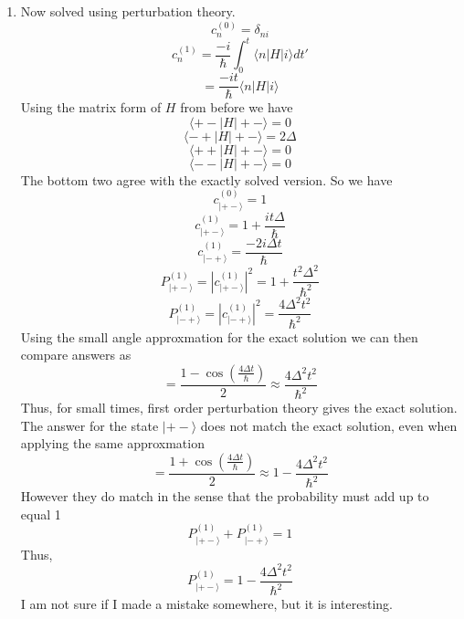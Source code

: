 \documentclass[12pt]{article}
\newcommand{\ket}[1]{\vert{#1}\rangle}
\begin{document}
\begin{enumerate}
    \item Now solved using perturbation theory. 
    $$ c_n^{(0)} = \delta_{ni} $$
    $$ c_n^{(1)} = \frac{-i}{\hbar} \int_0^t \langle n | H | i \rangle dt' $$
    $$ = \frac{-it}{\hbar} \langle n | H | i \rangle $$
    Using the matrix form of $H$ from before we have 
    $$ \langle +- | H | +- \rangle =0 $$
    $$ \langle -+ | H | +- \rangle = 2 \Delta $$
    $$ \langle ++ | H | +- \rangle =0 $$
    $$ \langle -- | H | +- \rangle = 0 $$
    The bottom two agree with the exactly solved version. So we have 
    $$ c_{\ket{+-} }^{(0)} = 1 $$
    $$ c_{\ket{+-}}^{(1)} = 1 + \frac{it \Delta}{\hbar} $$
    $$ c_{\ket{-+}}^{(1)} = \frac{-2i \Delta t}{\hbar} $$
    $$ P_{\ket{+-} }^{(1)} = | c_{\ket{+-}}^{(1)} |^2 = 1 + \frac{t^2 \Delta^2}{\hbar^2} $$
    $$ P_{\ket{-+}}^{(1)} = | c_{\ket{-+} }^{(1)} |^2 = \frac{4 \Delta^2 t^2}{\hbar^2} $$
    Using the small angle approxmation for the exact solution we can then compare answers as 
    $$ = \frac{1 - \cos (\frac{4 \Delta t}{\hbar}  )}{2} \approx \frac{4 \Delta^2 t^2}{\hbar^2} $$
    Thus, for small times, first order perturbation theory gives the exact solution. The answer for the state $\ket{+-}$ does not match the exact solution, even when applying the same approxmation 
    $$ = \frac{1 + \cos( \frac{4 \Delta t}{\hbar} )}{2} \approx 1 - \frac{4 \Delta^2 t^2}{\hbar^2} $$
    However they do match in the sense that the probability must add up to equal 1
    $$ P_{\ket{+-}}^{(1)} + P_{\ket{-+}}^{(1)} = 1 $$
    Thus, 
    $$ P_{\ket{+-}}^{(1)} = 1- \frac{4 \Delta^2 t^2}{\hbar^2} $$
    I am not sure if I made a mistake somewhere, but it is interesting. 


\end{enumerate}
\end{document}
